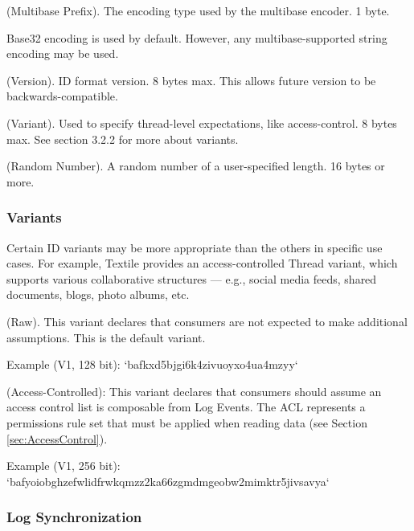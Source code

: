 \documentclass{comjnl}
\begin{document}
\begin{definition}
(Multibase Prefix). The encoding type used by the multibase encoder. 1 byte.
\end{definition}

Base32 encoding is used by default. However, any multibase-supported string encoding may be used.

\begin{definition}
(Version). ID format version. 8 bytes max. This allows future version to be backwards-compatible.
\end{definition}

\begin{definition}
(Variant). Used to specify thread-level expectations, like access-control. 8 bytes max. See section 3.2.2 for more about variants.
\end{definition}

\begin{definition}
(Random Number). A random number of a user-specified length. 16 bytes or more.
\end{definition}

\subsubsection{Variants}

Certain ID variants may be more appropriate than the others in specific use cases. For example, Textile provides an access-controlled Thread variant, which supports various collaborative structures — e.g., social media feeds, shared documents, blogs, photo albums, etc.


\begin{definition}
(Raw). This variant declares that consumers are not expected to make additional assumptions. This is the default variant. 
\end{definition}

Example (V1, 128 bit): `bafkxd5bjgi6k4zivuoyxo4ua4mzyy`


\begin{definition}
(Access-Controlled): This variant declares that consumers should assume an access control list is composable from Log Events. The ACL represents a permissions rule set that must be applied when reading data (see Section  \ref{sec:AccessControl}).
\end{definition}

Example (V1, 256 bit): `bafyoiobghzefwlidfrwkqmzz2ka66zgmdmgeobw2mimktr5jivsavya`

\subsubsection{Log Synchronization} \label{sec:LogSync}
\end{document}
